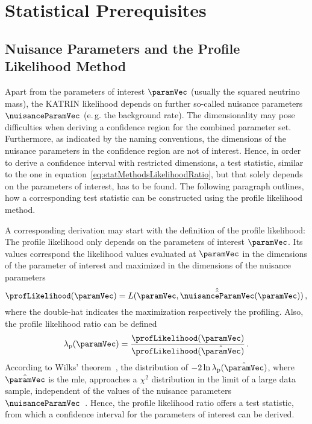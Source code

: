 \def\currentRootFolder{chapter/sensitivityStudyWithPreliminaryKatrinElossModel/statisticalPrerequisites}
\def\currentFigureFolder{\currentRootFolder/fig}



\section{Statistical Prerequisites}
\label{sec:katrinElossStatistics}
\subsection{Nuisance Parameters and the Profile Likelihood Method}
\label{sec:statMethodsProfileLikelihood}
Apart from the  parameters of interest $\paramVec$ (usually the squared neutrino mass), the KATRIN likelihood depends on further so-called nuisance parameters $\nuisanceParamVec$ (e.\,g. the background rate). The dimensionality may pose difficulties when deriving a confidence region for the combined parameter set. Furthermore, as indicated by the naming conventions, the dimensions of the nuisance parameters in the confidence region are not of interest. Hence, in order to derive a confidence interval with restricted dimensions, a test statistic, similar to the one in equation~\ref{eq:statMethodsLikelihoodRatio}, but that solely depends on the parameters of interest, has to be found. The following paragraph outlines, how a corresponding test statistic can be constructed using the profile likelihood method.

A corresponding derivation may start with the definition of the profile likelihood: The profile likelihood only depends on the parameters of interest $\paramVec$. Its values correspond the likelihood values evaluated at $\paramVec$ in the dimensions of the parameter of interest and maximized in the dimensions of the nuisance parameters~\cite{ReviewOfParticlePhysics}
\begin{equation}
\profLikelihood(\paramVec) = 
L(\paramVec, \hat{\hat{\nuisanceParamVec}}(\paramVec))
\comma
\end{equation}
where the double-hat indicates the maximization respectively the profiling. Also, the profile likelihood ratio can be defined~\cite{ReviewOfParticlePhysics}
\begin{equation}
\label{eq:statMethodsProfileLikelihoodRatio}
\lambda_\mathrm{p}(\paramVec) = 
\frac{\profLikelihood(\paramVec)}{\profLikelihood(\hat{\paramVec})}
\fullstop
\end{equation}
According to Wilks’ theorem~\cite{wilks1938}, the distribution of $-2\ln\lambda_\mathrm{p}(\hat{\paramVec})$, where $\hat{\paramVec}$ is the \gls{mle}, approaches a $\chi^2$ distribution in the limit of a large data sample, independent of the values of the nuisance parameters $\nuisanceParamVec$~\cite{ReviewOfParticlePhysics}. Hence, the profile likelihood ratio offers a test statistic, from which a confidence interval for the parameters of interest can be derived.

